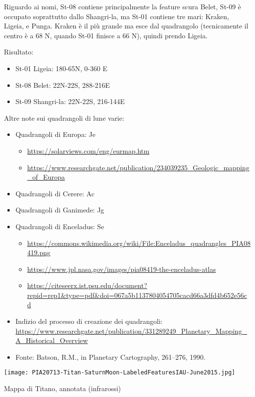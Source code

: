 \documentclass[a4paper,10pt,openany,oneside]{memoir}
\begin{document}
Riguardo ai nomi, St-08 contiene principalmente la feature scura Belet, St-09 è occupato soprattutto dallo Shangri-la, ma St-01 contiene tre mari: Kraken, Ligeia, e Punga. Kraken è il più grande ma esce dal quadrangolo (tecnicamente il centro è a 68 N, quando St-01 finisce a 66 N), quindi prendo Ligeia.

Risultato:
\begin{itemize}
\item St-01 Ligeia: 180-65N, 0-360 E 
\item St-08 Belet: 22N-22S, 288-216E
\item St-09 Shangri-la: 22N-22S, 216-144E
\end{itemize}

Altre note sui quadrangoli di lune varie:

\begin{itemize}
  \item Quadrangoli di Europa: Je 
  \begin{itemize}
    \item \url{https://solarviews.com/eng/eurmap.htm}
    \item \url{https://www.researchgate.net/publication/234039235_Geologic_mapping_of_Europa}
  \end{itemize}
  \item Quadrangoli di Cerere: Ac 
  \item Quadrangoli di Ganimede: Jg
  \item Quadrangoli di Enceladus: Se 
  \begin{itemize}
    \item \url{https://commons.wikimedia.org/wiki/File:Enceladus_quadrangles_PIA08419.png} 
    \item \url{https://www.jpl.nasa.gov/images/pia08419-the-enceladus-atlas} 
    \item \url{https://citeseerx.ist.psu.edu/document?repid=rep1&type=pdf&doi=067a5b1137804054705cacd66a3dfd4b652e56cd}
  \end{itemize}
  \item Indizio del processo di creazione dei quadrangoli: \url{https://www.researchgate.net/publication/331289249_Planetary_Mapping_A_Historical_Overview}
  \item Fonte: Batson, R.M., in Planetary Cartography, 261–276, 1990.
\end{itemize}


\texttt{[image: PIA20713-Titan-SaturnMoon-LabeledFeaturesIAU-June2015.jpg]}

Mappa di Titano, annotata (infrarossi)
\end{document}

